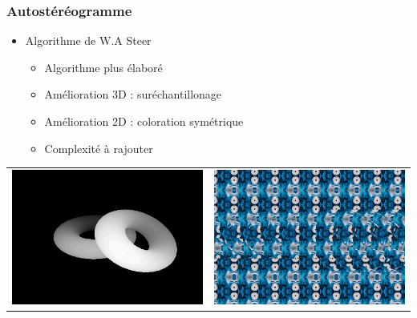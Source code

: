 \documentclass{beamer}
\begin{document}
%
\begin{frame}
\frametitle{Autostéréogramme}
\begin{itemize}[label=$\bullet$]
	\item Algorithme de W.A Steer \cite{wasteer}
	\begin{itemize}[label=$\circ$]
	\item Algorithme plus élaboré
	\item Amélioration 3D : suréchantillonage
	\item Amélioration 2D : coloration symétrique
	\item Complexité à rajouter
	\end{itemize}
\end{itemize}
\begin{tabular}{l|r}
\includegraphics[scale=0.22]{donutdepth.png}
&
\includegraphics[scale=0.22]{donut2.png}
\end{tabular}

\end{frame}
\end{document}

